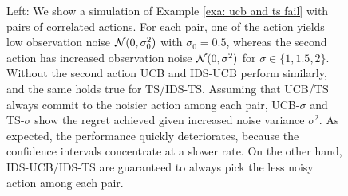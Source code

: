 \begin{figure}
	\centering   	
	\hspace{-15pt}
	\hspace{10pt}
	\hspace{-20pt}
	\caption{Left: We show a simulation of Example \ref{exa: ucb and ts fail} with pairs of correlated actions. For each pair, one of the action yields low observation noise $\mathcal{N}(0, \sigma_0^2)$ with $\sigma_0=0.5$, whereas the second action has increased observation noise $\mathcal{N}(0, \sigma^2)$ for $\sigma \in \{1, 1.5, 2\}$. Without the second action UCB and IDS-UCB perform similarly, and the same holds true for TS/IDS-TS. Assuming that UCB/TS always commit to the noisier action among each pair, UCB-$\sigma$ and TS-$\sigma$  show the regret achieved given increased noise variance $\sigma^2$. As expected, the performance quickly deteriorates, because the confidence intervals concentrate at a slower rate. On the other hand, IDS-UCB/IDS-TS are guaranteed to always pick the less noisy action among each pair.\\
}
\end{figure}
